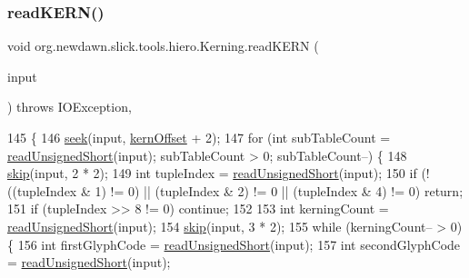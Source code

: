 \subsubsection{\texorpdfstring{read\+K\+E\+R\+N()}{readKERN()}}
{\footnotesize\ttfamily void org.\+newdawn.\+slick.\+tools.\+hiero.\+Kerning.\+read\+K\+E\+RN (\begin{DoxyParamCaption}\item[{Input\+Stream}]{input }\end{DoxyParamCaption}) throws I\+O\+Exception\hspace{0.3cm}{\ttfamily [inline]}, {\ttfamily [private]}}


\begin{DoxyCode}
145                                                                  \{
146         \mbox{\hyperlink{classorg_1_1newdawn_1_1slick_1_1tools_1_1hiero_1_1_kerning_a67a8ed1a557f152dab4fe70c02c1a5e9}{seek}}(input, \mbox{\hyperlink{classorg_1_1newdawn_1_1slick_1_1tools_1_1hiero_1_1_kerning_a382489aa078253e87f23dc0be2ebd299}{kernOffset}} + 2);
147         \textcolor{keywordflow}{for} (\textcolor{keywordtype}{int} subTableCount = \mbox{\hyperlink{classorg_1_1newdawn_1_1slick_1_1tools_1_1hiero_1_1_kerning_a8e409fe133f0b1741ba0c5a52ef13910}{readUnsignedShort}}(input); subTableCount > 0; 
      subTableCount--) \{
148             \mbox{\hyperlink{classorg_1_1newdawn_1_1slick_1_1tools_1_1hiero_1_1_kerning_afa04157519725497f528b5bc175f1abb}{skip}}(input, 2 * 2);
149             \textcolor{keywordtype}{int} tupleIndex = \mbox{\hyperlink{classorg_1_1newdawn_1_1slick_1_1tools_1_1hiero_1_1_kerning_a8e409fe133f0b1741ba0c5a52ef13910}{readUnsignedShort}}(input);
150             \textcolor{keywordflow}{if} (!((tupleIndex & 1) != 0) || (tupleIndex & 2) != 0 || (tupleIndex & 4) != 0) \textcolor{keywordflow}{return};
151             \textcolor{keywordflow}{if} (tupleIndex >> 8 != 0) \textcolor{keywordflow}{continue};
152 
153             \textcolor{keywordtype}{int} kerningCount = \mbox{\hyperlink{classorg_1_1newdawn_1_1slick_1_1tools_1_1hiero_1_1_kerning_a8e409fe133f0b1741ba0c5a52ef13910}{readUnsignedShort}}(input);
154             \mbox{\hyperlink{classorg_1_1newdawn_1_1slick_1_1tools_1_1hiero_1_1_kerning_afa04157519725497f528b5bc175f1abb}{skip}}(input, 3 * 2);
155             \textcolor{keywordflow}{while} (kerningCount-- > 0) \{
156                 \textcolor{keywordtype}{int} firstGlyphCode = \mbox{\hyperlink{classorg_1_1newdawn_1_1slick_1_1tools_1_1hiero_1_1_kerning_a8e409fe133f0b1741ba0c5a52ef13910}{readUnsignedShort}}(input);
157                 \textcolor{keywordtype}{int} secondGlyphCode = \mbox{\hyperlink{classorg_1_1newdawn_1_1slick_1_1tools_1_1hiero_1_1_kerning_a8e409fe133f0b1741ba0c5a52ef13910}{readUnsignedShort}}(input);

\end{DoxyCode}
